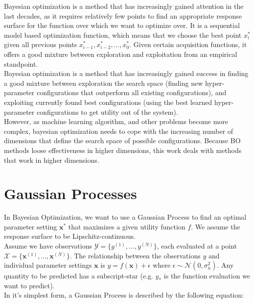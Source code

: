 \documentclass[a4paper,12pt,twoside,openright]{report}
\begin{document}
Bayesian optimization is a method that has increasingly gained attention in the last decades, as it requires relatively few points to find an appropriate response surface for the function over which we want to optimize over.
It is a sequential model based optimization function, which means that we choose the best point $x^*_i$ given all previous points $x^*_{i-1}, x^*_{i-2}, \ldots, x^*_{0}$.
Given certain acquisition functions, it offers a good mixture between exploration and exploitation from an empirical standpoint. \\

Bayesian optimization is a method that has increasingly gained success in finding a good mixture between exploration the search space (finding new hyper-parameter configurations that outperform all existing configurations), and exploiting currently found best configurations (using the best learned hyper-parameter configurations to get utility out of the system). \\

However, as machine learning algorithm, and other problems become more complex, bayesian optimization needs to cope with the increasing number of dimensions that define the search space of possible configurations.
Because BO methods loose effectiveness in higher dimensions, this work deals with methods that work in higher dimensions.

\section{Gaussian Processes}
In Bayesian Optimization, we want to use a Gaussian Process to find an optimal parameter setting $\mathbf{x^*}$ that maximizes a given utility function $f$.
We assume the response surface to be Lipschitz-continuous. \\

Assume we have observations $ \mathcal{Y} = \{ y^{(1)}, \ldots, y^{(N)} \}$, each evaluated at a point $ \mathcal{X} = \{  \mathbf{x}^{(1)}, \ldots, \mathbf{x}^{(N)} \}$.
The relationship between the observations $y$ and individual parameter settings $\mathbf{x}$ is $y = f \left( \mathbf{x} \right) + \epsilon$ where $\epsilon \sim  \mathcal{N} \left( 0, \sigma^2_n \right)$. Any quantity to be predicted has a subscript-star (e.g. $y_*$ is the function evaluation we want to predict).\\

In it's simplest form, a Gaussian Process is described by the following equation:
\end{document}
